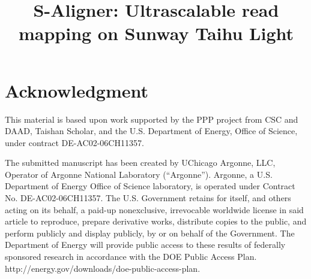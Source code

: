 \documentclass[conference]{IEEEtran}
\begin{document}
\title{S-Aligner: Ultrascalable read mapping on Sunway Taihu Light}
\thispagestyle{plain}
\pagestyle{plain}
\author{
\and
{}
\and
{}
\and
{}
}

\maketitle




\IEEEpeerreviewmaketitle







\section*{Acknowledgment}
This material is based upon work supported by the PPP project from CSC and DAAD, 
Taishan Scholar, and the U.S. Department of Energy, Office of Science, under contract 
DE-AC02-06CH11357.




\vspace{20pt} \footnotesize{The submitted manuscript has been created
  by UChicago Argonne, LLC, Operator of Argonne National Laboratory
  (``Argonne'').  Argonne, a U.S. Department of Energy Office of
  Science laboratory, is operated under Contract
  No. DE-AC02-06CH11357. The U.S. Government retains for itself, and
  others acting on its behalf, a paid-up nonexclusive, irrevocable
  worldwide license in said article to reproduce, prepare derivative
  works, distribute copies to the public, and perform publicly and
  display publicly, by or on behalf of the Government.  The Department
  of Energy will provide public access to these results of federally
  sponsored research in accordance with the DOE Public Access
  Plan. http://energy.gov/downloads/doe-public-access-plan.}
\end{document}
